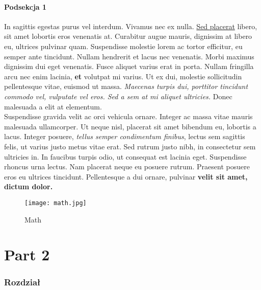 \documentclass[12pt,a4paper]{article}
\begin{document}
	\subsection{Podsekcja 1}
	\label{Podsekcja 1}
	In sagittis egestas purus vel interdum. Vivamus nec ex nulla. \underline{Sed placerat}  libero, sit amet lobortis eros venenatis at. Curabitur augue mauris, dignissim at libero eu, ultrices pulvinar quam. Suspendisse molestie lorem ac tortor efficitur, eu semper ante tincidunt. Nullam hendrerit et lacus nec venenatis. Morbi maximus dignissim dui eget venenatis. Fusce aliquet varius erat in porta. Nullam fringilla arcu nec enim lacinia, \textbf{et} volutpat mi varius. Ut ex dui, molestie sollicitudin pellentesque vitae, euismod ut massa. \textit{Maecenas turpis dui, porttitor tincidunt commodo vel, vulputate vel eros. Sed a sem at mi aliquet ultricies.} Donec malesuada a elit at elementum. \\Suspendisse gravida velit ac orci vehicula ornare. Integer ac massa vitae mauris malesuada ullamcorper. Ut neque nisl, placerat sit amet bibendum eu, lobortis a lacus. Integer posuere, \textit{tellus semper condimentum finibus}, lectus sem sagittis felis, ut varius justo metus vitae erat. Sed rutrum justo nibh, in consectetur sem ultricies in. In faucibus turpis odio, ut consequat est lacinia eget. Suspendisse rhoncus urna lectus. Nam placerat neque eu posuere rutrum. Praesent posuere eros eu ultrices tincidunt. Pellentesque a dui ornare, pulvinar  \textbf{velit sit amet, dictum dolor.}
	\begin{figure}[H]
		\centering
		\texttt{[image: math.jpg]}
		\caption{Math}
		\label{fig: Math}
	\end{figure}
	
	\part{Part 2}
	\section{Rozdział}
\end{document}
